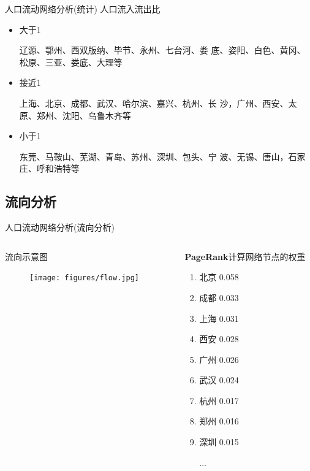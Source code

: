 \begin{frame}[t]{人口流动网络分析(统计)}
    人口流入流出比
    
    \begin{itemize}
        \pause
        \item \alert{大于1}

        辽源、鄂州、西双版纳、毕节、永州、七台河、娄 底、姿阳、白色、黄冈、松原、三亚、娄底、大理等

        \pause
        \item \alert{接近1}

        上海、北京、成都、武汉、哈尔滨、嘉兴、杭州、长 沙，广州、西安、太原、郑州、沈阳、乌鲁木齐等

        \pause
        \item \alert{小于1}

        东莞、马鞍山、芜湖、青岛、苏州、深圳、包头、宁 波、无锡、唐山，石家庄、呼和浩特等
    \end{itemize}
\end{frame}

\subsection{流向分析}

\begin{frame}[t]{人口流动网络分析(流向分析)}
    \begin{columns}
        \begin{column}{0.4 \textwidth}
            \alert{流向示意图}

            \begin{figure}
                \texttt{[image: figures/flow.jpg]}
            \end{figure}
        \end{column}

        \pause
        \begin{column}{0.6 \textwidth}
            \textbf{PageRank}计算网络节点的权重

            \begin{enumerate}
                \item 北京 0.058
                \item 成都 0.033
                \item 上海 0.031
                \item 西安 0.028
                \item 广州 0.026
                \item 武汉 0.024
                \item 杭州 0.017
                \item 郑州 0.016
                \item 深圳 0.015
                
                $\ldots$
            \end{enumerate}
        \end{column}
    \end{columns}
\end{frame}


